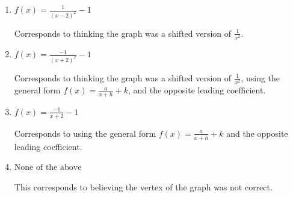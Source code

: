 \documentclass{extbook}[14pt]
\begin{document}
\begin{enumerate}
{\begin{enumerate}[label=\Alph*.]
This is the correct option.
\item \( f(x) = \frac{1}{(x - 2)^2} - 1 \)

Corresponds to thinking the graph was a shifted version of $\frac{1}{x^2}$.
\item \( f(x) = \frac{-1}{(x + 2)^2} - 1 \)

Corresponds to thinking the graph was a shifted version of $\frac{1}{x^2}$, using the general form $f(x) = \frac{a}{x+h}+k$, and the opposite leading coefficient.
\item \( f(x) = \frac{-1}{x + 2} - 1 \)

Corresponds to using the general form $f(x) = \frac{a}{x+h}+k$ and the opposite leading coefficient.
\item \( \text{None of the above} \)

This corresponds to believing the vertex of the graph was not correct.
\end{enumerate}

}
\end{enumerate}
\end{document}
